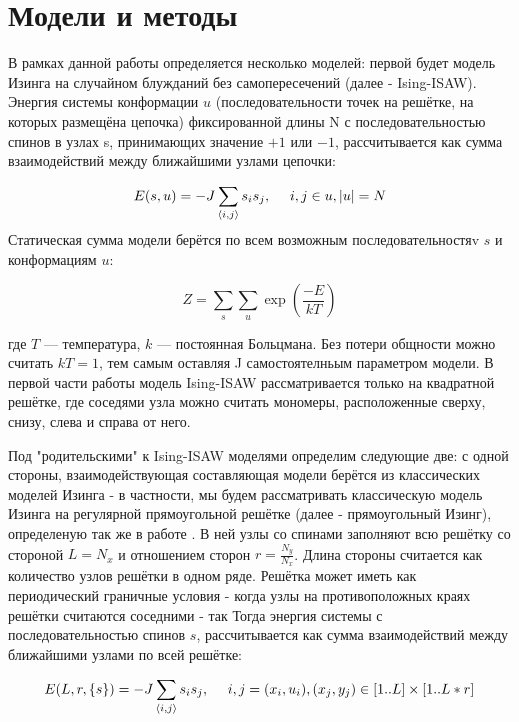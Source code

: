 \section{Модели и методы}
В рамках данной работы определяется несколько моделей: первой будет модель Изинга на случайном блужданий без самопересечений (далее - Ising-ISAW). Энергия системы конформации $u$ (последовательности точек на решётке, на которых размещёна цепочка) фиксированной длины N с последовательностью спинов в узлах s, принимающих значение $+1$ или $-1$, рассчитывается как сумма взаимодействий между ближайшими узлами цепочки:

\begin{equation}
E(s,u) = -J \sum_{\langle i, j \rangle} s_i s_j,\ \ \ \ i,j \in u, |u|=N
\end{equation}
Статическая сумма модели берётся по всем возможным последовательностяv ${s}$ и конформациям $u$:

\begin{equation}
Z = \sum_s \sum_u \exp{(\frac{-E}{kT})}
\end{equation}

где $T$ — температура, $k$ — постоянная Больцмана. Без потери общности можно считать $kT = 1$, тем самым оставляя J самостоятелньым параметром модели.
В первой части работы модель Ising-ISAW рассматривается только на квадратной решётке, где соседями узла можно считать мономеры, расположенные сверху, снизу, слева и справа от него.

Под "родительскими" к Ising-ISAW моделями определим следующие две: с одной стороны, взаимодействующая составляющая модели берётся из классических моделей Изинга - в частности, мы будем рассматривать классическую модель Изинга на регулярной прямоугольной решётке (далее - прямоугольный Изинг), определеную так же в работе \cite{selke2006critical}.
В ней узлы со спинами заполняют всю решётку со стороной $L=N_x$ и отношением сторон $r=\frac{N_y}{N_x}$. Длина стороны считается как количество узлов решётки в одном ряде. 
Решётка может иметь как периодический граничные условия - когда узлы на противоположных краях решётки считаются соседними - так 
Тогда энергия системы с последовательностью спинов $s$, рассчитывается как сумма взаимодействий между ближайшими узлами по всей решётке:

\begin{equation}
E(L, r, \{s\}) = -J \sum_{\langle i, j \rangle} s_i s_j,\ \ \ \ i,j = (x_i, u_i), (x_j, y_j) \in [1..L] \times [1..L*r]
\end{equation}

